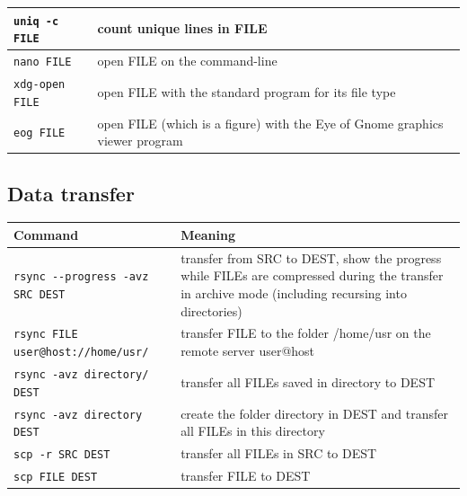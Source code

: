 \documentclass[11pt]{article}
\begin{document}
\begin{center}
\begin{tabular}{ll}
\hline
 \texttt{uniq -c  FILE}                                             &  count unique lines in FILE                                                                  \\
\hline
 \texttt{nano FILE}                                                 &  open FILE on the command-line                                                               \\
\hline
 \texttt{xdg-open  FILE}                                            &  open FILE with the standard program for its file type                                       \\
\hline
 \texttt{eog FILE}                                                  &  open FILE (which is a figure) with the Eye of Gnome graphics viewer program                 \\
\end{tabular}
\end{center}
\subsection{Data transfer}
\label{sec-7-3}


\begin{center}
\begin{tabular}{ll}
 Command                                    &  Meaning                                                                                                                                             \\
\hline
 \texttt{rsync -{}-progress -avz SRC DEST}  &  transfer from SRC to DEST, show the progress while FILEs are compressed during the transfer in archive mode (including recursing into directories)  \\
\hline
 \texttt{rsync FILE user@host://home/usr/}  &  transfer FILE to the folder /home/usr on the remote server user@host                                                                                \\
\hline
 \texttt{rsync -avz directory/ DEST}        &  transfer all FILEs saved in directory to DEST                                                                                                       \\
\hline
 \texttt{rsync -avz directory DEST}         &  create the folder directory in DEST and transfer all FILEs in this directory                                                                        \\
\hline
 \texttt{scp -r SRC DEST}                   &  transfer all FILEs in SRC to DEST                                                                                                                   \\
\hline
 \texttt{scp FILE DEST}                     &  transfer FILE to DEST                                                                                                                               \\
\end{tabular}
\end{center}
\end{document}

